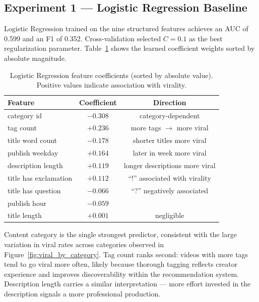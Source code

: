 \documentclass[12pt,a4paper]{article}
\begin{document}
\subsection{Experiment 1 --- Logistic Regression Baseline}

Logistic Regression trained on the nine structured features achieves an AUC of
0.599 and an F1 of 0.352.  Cross-validation selected $C = 0.1$ as the best
regularization parameter.  Table~\ref{tab:coef} shows the learned coefficient
weights sorted by absolute magnitude.

\begin{table}[H]
  \centering
  \caption{Logistic Regression feature coefficients (sorted by absolute value).
           Positive values indicate association with virality.}
  \label{tab:coef}
  \begin{tabular}{lcc}
    \toprule
    \textbf{Feature} & \textbf{Coefficient} & \textbf{Direction} \\
    \midrule
    category id           & $-0.308$ & category-dependent \\
    tag count             & $+0.236$ & more tags $\to$ more viral \\
    title word count      & $-0.178$ & shorter titles more viral \\
    publish weekday       & $+0.164$ & later in week more viral \\
    description length    & $+0.119$ & longer descriptions more viral \\
    title has exclamation & $+0.112$ & ``!'' associated with virality \\
    title has question    & $-0.066$ & ``?'' negatively associated \\
    publish hour          & $-0.059$ & \\
    title length          & $+0.001$ & negligible \\
    \bottomrule
  \end{tabular}
\end{table}

Content category is the single strongest predictor, consistent with the large
variation in viral rates across categories observed in Figure~\ref{fig:viral_by_category}.
Tag count ranks second: videos with more tags tend to go viral more often,
likely because thorough tagging reflects creator experience and improves
discoverability within the recommendation system.  Description length carries
a similar interpretation --- more effort invested in the description signals
a more professional production.
\end{document}

